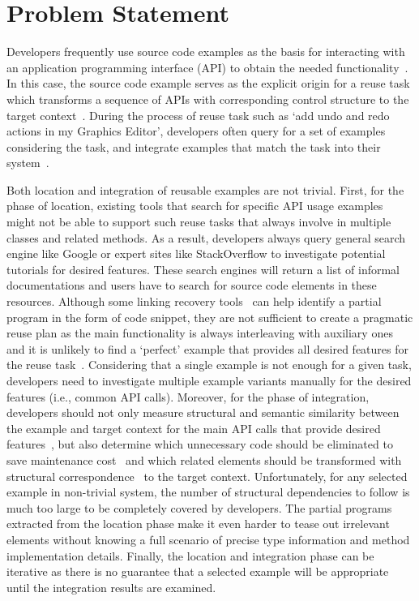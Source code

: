 
\section{Problem Statement}

Developers frequently use source code examples as the basis for interacting with an  application programming interface (API) to obtain the needed functionality~\cite{CodeSearch:FSE15}.  In this case, the source code example serves as the explicit origin for a reuse task which transforms a sequence of APIs with corresponding control structure to the target context~\cite{Frakes:reuseStatus05}.  During the process of reuse task such as `add undo and redo actions in my Graphics Editor', developers often query for a set of examples considering the task, and integrate examples that match the task into their system~\cite{Parsons:cognitiveReuse04}. 

Both location and integration of reusable examples are not trivial. First, for the phase of location, existing tools that search for specific API usage examples~\cite{MAPO:ECOOP09, Buse:apiICSE12, Export:DenysASE13, Sourcerer:SC14} might not be able to support such reuse tasks that always involve in multiple classes and related methods.  As a result, developers always query general search engine like Google or expert sites like StackOverflow to investigate potential tutorials for desired features. These search engines will return a list of informal documentations and users have to search for source code elements in these resources. Although some linking recovery  tools~\cite{PeterACE:ICSE13, RecoDoc:ICSE12} can help identify a partial program in the form of code snippet, they are not  sufficient to create a pragmatic reuse plan as the main functionality is always interleaving with auxiliary ones and  it is unlikely to find a `perfect' example that provides all desired features for the reuse task~\cite{Holmes:reuseStudy09}. Considering that a single example is not enough for a given task, developers need to investigate multiple example variants manually for the desired features (i.e., common API calls). Moreover, for the phase of integration, developers should not only  measure structural and semantic similarity between the example and target context for the main API calls that provide desired features~\cite{Cottrell:jigsaw08}, but also determine which unnecessary code should be eliminated to save maintenance cost~\cite{Holmes:ASE09, Holmes:reuse07} and which related elements should be transformed with structural correspondence~\cite{Cottrell:generalize07} to the target context. Unfortunately, for any selected example in non-trivial system, the number of structural dependencies to follow is much too large to be completely covered by developers. The partial programs~\cite{partialProgram:OOPSLA08} extracted from the location phase make it even harder to  tease out irrelevant elements  without knowing a full scenario of precise type information and method implementation details.  Finally, the location and integration phase can be iterative as there is no guarantee that a selected example will be appropriate until the integration results are examined. 

